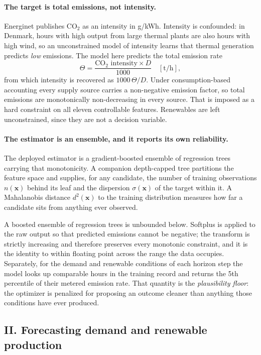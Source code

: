 \documentclass[11pt]{article}
\begin{document}
\paragraph{The target is total emissions, not intensity.}
Energinet publishes CO$_2$ as an intensity in g/kWh. Intensity is
confounded: in Denmark, hours with high output from large thermal plants are
also hours with high wind, so an unconstrained model of intensity learns
that thermal generation predicts \emph{low} emissions. The model here
predicts the total emission rate
\begin{equation}
\Theta = \frac{\text{CO}_2\text{ intensity} \times D}{1000} \quad [\mathrm{t/h}],
\end{equation}
from which intensity is recovered as $1000\,\Theta / D$. Under
consumption-based accounting every supply source carries a non-negative
emission factor, so total emissions are monotonically non-decreasing in
every source. That is imposed as a hard constraint on all eleven
controllable features. Renewables are left unconstrained, since they are
not a decision variable.

\paragraph{The estimator is an ensemble, and it reports its own reliability.}
The deployed estimator is a gradient-boosted ensemble of regression trees
carrying that monotonicity. A companion depth-capped tree partitions the
feature space and supplies, for any candidate, the number of training
observations $n(\mathbf{x})$ behind its leaf and the dispersion
$\sigma(\mathbf{x})$ of the target within it. A Mahalanobis distance
$d^2(\mathbf{x})$ to the training distribution measures how far a candidate
sits from anything ever observed.

A boosted ensemble of regression trees is unbounded below. Softplus is
applied to the raw output so that predicted emissions cannot be negative;
the transform is strictly increasing and therefore preserves every
monotonic constraint, and it is the identity to within floating point
across the range the data occupies. Separately, for the demand and
renewable conditions of each horizon step the model looks up comparable
hours in the training record and returns the 5th percentile of their
metered emission rate. That quantity is the \emph{plausibility floor}: the
optimizer is penalized for proposing an outcome cleaner than anything
those conditions have ever produced.

\subsection{II. Forecasting demand and renewable production}
\end{document}
